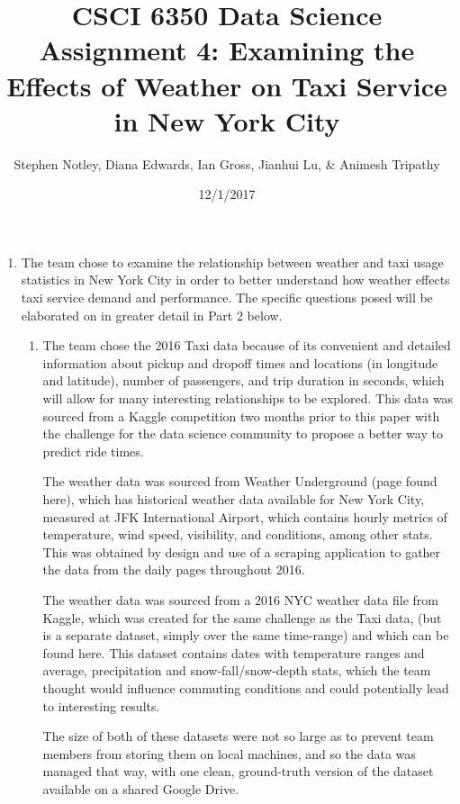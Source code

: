 \documentclass{article}
\title{CSCI 6350 Data Science Assignment 4: Examining the Effects of Weather on Taxi Service in New York City}
\author{Stephen Notley, Diana Edwards, Ian Gross, Jianhui Lu, \& Animesh Tripathy}
\date{12/1/2017}
\begin{document}
\maketitle

\begin{enumerate}

    \item %

    The team chose to examine the relationship between weather and taxi usage statistics in New York City in order to better understand how weather effects taxi service demand and performance. The specific questions posed will be elaborated on in greater detail in Part 2 below.

    \begin{enumerate}

        \item %
        The team chose the 2016 Taxi data because of its convenient and detailed information about pickup and dropoff times and locations (in longitude and latitude), number of passengers, and trip duration in seconds, which will allow for many interesting relationships to be explored. This data was sourced from a Kaggle competition two months prior to this paper with the challenge for the data science community to propose a better way to predict ride times.  %

        The weather data was sourced from Weather Underground (page found here), which has historical weather data available for New York City, measured at JFK International Airport, which contains hourly metrics of temperature, wind speed, visibility, and conditions, among other stats. This was obtained by design and use of a scraping application to gather the data from the daily pages throughout 2016. %

        The weather data was sourced from a 2016 NYC weather data file from Kaggle, which was created for the same challenge as the Taxi data, (but is a separate dataset, simply over the same time-range) and which can be found here. This dataset contains dates with temperature ranges and average, precipitation and snow-fall/snow-depth stats, which the team thought would influence commuting conditions and could potentially lead to interesting results. %

        The size of both of these datasets were not so large as to prevent team members from storing them on local machines, and so the data was managed that way, with one clean, ground-truth version of the dataset available on a shared Google Drive.


\end{enumerate}
\end{enumerate}
\end{document}
